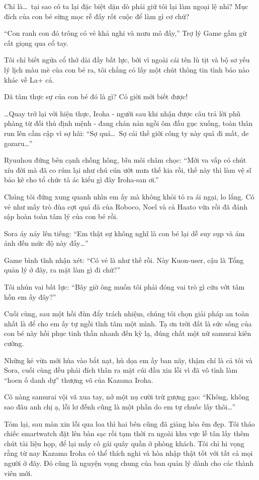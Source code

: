 \documentclass[../main.tex]{subfiles}
\begin{document}
Chỉ là\dots\ tại sao cô ta lại đặc biệt dặn dò phải giữ tôi lại làm ngoại lệ nhỉ? Mục đích của con bé sừng mọc rễ đấy rốt cuộc để làm gì cơ chứ?

``Con ranh con đó trông có vẻ khả nghi và mưu mô đấy,'' Trợ lý Game gầm gừ cất giọng qua cổ tay.

Tôi chỉ biết ngửa cổ thở dài đầy bất lực, bởi vì ngoài cái tên lù tịt và bộ sơ yếu lý lịch màu mè của con bé ra, tôi chẳng có lấy một chút thông tin tình báo nào khác về La+ cả.

Dã tâm thực sự của con bé đó là gì? Có giời mới biết được!

\dots Quay trở lại với hiện thực, Iroha - người sau khi nhận được câu trả lời phũ phàng từ đối thủ định mệnh - đang chán nản ngồi ôm đầu gục xuống, toàn thân run lên cầm cập vì sợ hãi: ``Sợ quá\dots\ Sợ cái thế giới công ty này quá đi mất, de gozaru\dots''

Ryuuhou đứng bên cạnh chống hông, bĩu môi châm chọc: ``Mới va vấp có chút xíu đời mà đã co rúm lại như chú cún ướt mưa thế kia rồi, thế này thì làm vệ sĩ bảo kê cho tổ chức tà ác kiểu gì đây Iroha-san ơi.''

Chúng tôi đứng xung quanh nhìn em ấy mà không khỏi tỏ ra ái ngại, lo lắng. Có vẻ như mấy trò đùa cợt quá đà của Roboco, Noel và cả Haato vừa rồi đã đánh sập hoàn toàn tâm lý của con bé rồi.

Sora áy náy lên tiếng: ``Em thật sự không nghĩ là con bé lại dễ suy sụp và ám ảnh đến mức độ này đấy\dots''

Game bình tĩnh nhận xét: ``Có vẻ là như thế rồi. Này Kuon-user, cậu là Tổng quản lý ở đây, ra mặt làm gì đi chứ?''

Tôi nhún vai bất lực: ``Bây giờ ông muốn tôi phải đóng vai trò gì cứu vớt tâm hồn em ấy đây?''

Cuối cùng, sau một hồi đùn đẩy trách nhiệm, chúng tôi chọn giải pháp an toàn nhất là để cho em ấy tự ngồi tĩnh tâm một mình. Tạ ơn trời đất là sức sống của con bé này hồi phục tinh thần nhanh đến kỳ lạ, đúng chất một nữ samurai kiên cường.

Những kẻ vừa mới hùa vào bắt nạt, hù dọa em ấy ban nãy, thậm chí là cả tôi và Sora, cuối cùng đều phải đích thân ra mặt cúi đầu xin lỗi vì đã vô tình làm ``hoen ố danh dự'' thượng võ của Kazama Iroha.

Cô nàng samurai vội vã xua tay, nở một nụ cười trừ gượng gạo: ``Không, không sao đâu anh chị ạ, lỗi lơ đễnh cũng là một phần do em tự chuốc lấy thôi\dots''

Tóm lại, sau màn xin lỗi qua loa thì hai bên cũng đã giảng hòa êm đẹp. Tôi tháo chiếc smartwatch đặt lên bàn sạc rồi tạm thời ra ngoài khu vực lễ tân lấy thêm chút tài liệu họp, để lại mấy cô gái quây quần ở phòng khách. Tôi chỉ hi vọng rằng từ nay Kazama Iroha có thể thích nghi và hòa nhập thật tốt với tất cả mọi người ở đây. Đó cũng là nguyện vọng chung của ban quản lý dành cho các thành viên mới.
\end{document}
